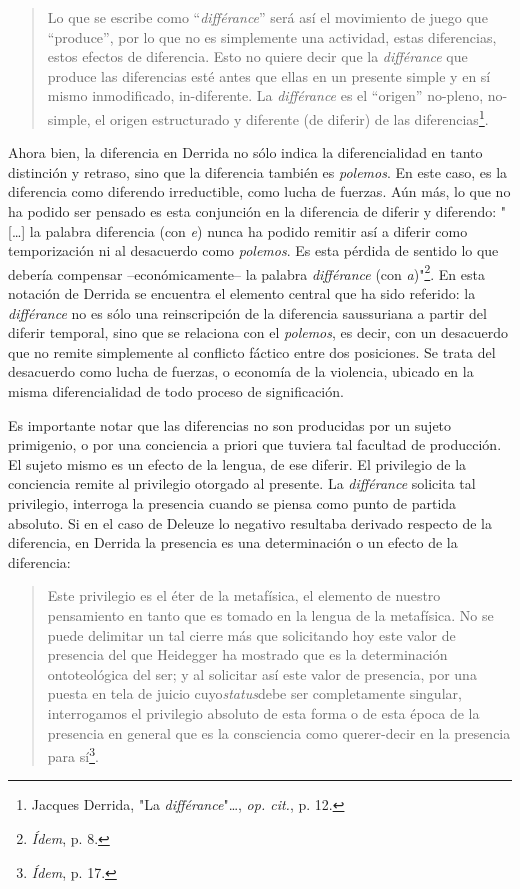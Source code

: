 \documentclass{book}
\begin{document}
\begin{quote}
Lo que se escribe como ``\emph{différance}'' será así el movimiento de
juego que ``produce'', por lo que no es simplemente una actividad, estas
diferencias, estos efectos de diferencia. Esto no quiere decir que la
\emph{différance} que produce las diferencias esté antes que ellas en un
presente simple y en sí mismo inmodificado, in-diferente. La
\emph{différance} es el ``origen'' no-pleno, no-simple, el origen
estructurado y diferente (de diferir) de las diferencias\footnote{Jacques
  Derrida, "La \emph{différance}"\ldots, \emph{op. cit.}, p. 12.}.
\end{quote}

Ahora bien, la diferencia en Derrida no sólo indica la diferencialidad
en tanto distinción y retraso, sino que la diferencia también es
\emph{polemos}. En este caso, es la diferencia como diferendo
irreductible, como lucha de fuerzas. Aún más, lo que no ha podido ser
pensado es esta conjunción en la diferencia de diferir y diferendo:
"{[}\ldots{]} la palabra diferencia (con \emph{e}) nunca ha podido
remitir así a diferir como temporización ni al desacuerdo como
\emph{polemos}. Es esta pérdida de sentido lo que debería compensar
--económicamente-- la palabra \emph{différance} (con
\emph{a})"\footnote{\emph{Ídem}, p. 8.}. En esta notación de Derrida se
encuentra el elemento central que ha sido referido: la \emph{différance}
no es sólo una reinscripción de la diferencia saussuriana a partir del
diferir temporal, sino que se relaciona con el \emph{polemos}, es decir,
con un desacuerdo que no remite simplemente al conflicto fáctico entre
dos posiciones. Se trata del desacuerdo como lucha de fuerzas, o
economía de la violencia, ubicado en la misma diferencialidad de todo
proceso de significación.

Es importante notar que las diferencias no son producidas por un sujeto
primigenio, o por una conciencia a priori que tuviera tal facultad de
producción. El sujeto mismo es un efecto de la lengua, de ese diferir.
El privilegio de la conciencia remite al privilegio otorgado al
presente. La \emph{différance} solicita tal privilegio, interroga la
presencia cuando se piensa como punto de partida absoluto. Si en el caso
de Deleuze lo negativo resultaba derivado respecto de la diferencia, en
Derrida la presencia es una determinación o un efecto de la diferencia:

\begin{quote}
Este privilegio es el éter de la metafísica, el elemento de nuestro
pensamiento en tanto que es tomado en la lengua de la metafísica. No se
puede delimitar un tal cierre más que solicitando hoy este valor de
presencia del que Heidegger ha mostrado que es la determinación
ontoteológica del ser; y al solicitar así este valor de presencia, por
una puesta en tela de juicio cuyo\emph{status}debe ser completamente
singular, interrogamos el privilegio absoluto de esta forma o de esta
época de la presencia en general que es la consciencia como querer-decir
en la presencia para sí\footnote{\emph{Ídem}, p. 17.}.
\end{quote}
\end{document}
